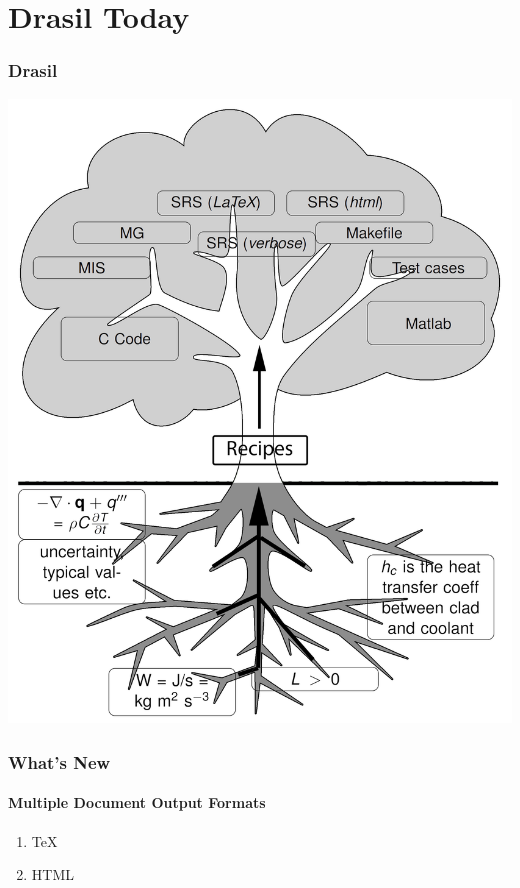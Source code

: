 \documentclass{beamer}
\begin{document}
\section[Drasil]{Drasil Today}


\begin{frame}

\frametitle{Drasil}
\begin{center}
\includegraphics[width=.65\textwidth]{tree.png}
\end{center}

\end{frame}


\begin{frame}

\frametitle{What's New}

\framesubtitle{Multiple Document Output Formats}

\begin{enumerate}
\item TeX
\item HTML
\end{enumerate}

\end{frame}

\end{document}
